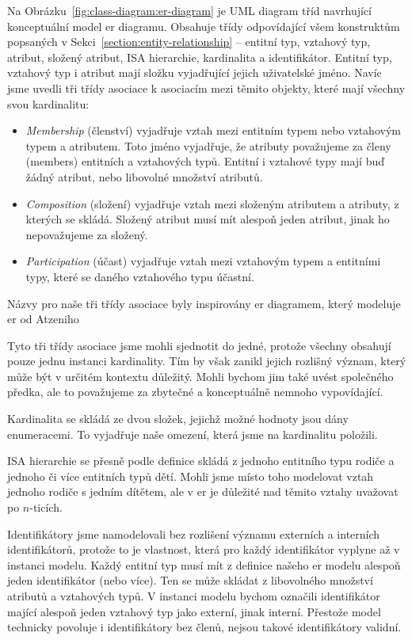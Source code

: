 Na Obrázku~\ref{fig:class-diagram:er-diagram} je \acrshort{UML} diagram tříd navrhující konceptuální model \acrshort{er} diagramu.
Obsahuje třídy odpovídající všem konstruktům popsaných v Sekci~\ref{section:entity-relationship} -- entitní typ, vztahový typ, atribut, složený atribut, ISA hierarchie, kardinalita a identifikátor.
Entitní typ, vztahový typ i atribut mají složku vyjadřující jejich uživatelské jméno.
Navíc jsme uvedli tři třídy asociace k asociacím mezi těmito objekty, které mají všechny svou kardinalitu:
\begin{itemize}
  \item \emph{Membership} (členství) vyjadřuje vztah mezi entitním typem nebo vztahovým typem a atributem.
        Toto jméno vyjadřuje, že atributy považujeme za členy (members) entitních a vztahových typů.
        Entitní i vztahové typy mají buď žádný atribut, nebo libovolné množství atributů.
  \item \emph{Composition} (složení) vyjadřuje vztah mezi složeným atributem a atributy, z kterých se skládá.
        Složený atribut musí mít alespoň jeden atribut, jinak ho nepovažujeme za složený.
  \item \emph{Participation} (účast) vyjadřuje vztah mezi vztahovým typem a entitními typy, které se daného vztahového typu účastní.
\end{itemize}

Názvy pro naše tři třídy asociace byly inspirovány \acrshort{er} diagramem, který modeluje \acrshort{er} od Atzeniho~\cite[Obr.~5.22]{atzeni_database_1999}

Tyto tři třídy asociace jsme mohli sjednotit do jedné, protože všechny obsahují pouze jednu instanci kardinality.
Tím by však zanikl jejich rozlišný význam, který může být v určitém kontextu důležitý.
Mohli bychom jim také uvést společného předka, ale to považujeme za zbytečné a konceptuálně nemnoho vypovídající.

Kardinalita se skládá ze dvou složek, jejichž možné hodnoty jsou dány enumeracemi.
To vyjadřuje naše omezení, která jsme na kardinalitu položili.

ISA hierarchie se přesně podle definice skládá z jednoho entitního typu rodiče a jednoho či více entitních typů dětí.
Mohli jsme místo toho modelovat vztah jednoho rodiče s jedním dítětem, ale v \acrshort{er} je důležité nad těmito vztahy uvažovat po $n$-ticích.

Identifikátory jsme namodelovali bez rozlišení významu externích a interních identifikátorů, protože to je vlastnost, která pro každý identifikátor vyplyne až v instanci modelu.
Každý entitní typ musí mít z definice našeho \acrshort{er} modelu alespoň jeden identifikátor (nebo více).
Ten se může skládat z libovolného množství atributů a vztahových typů.
V instanci modelu bychom označili identifikátor mající alespoň jeden vztahový typ jako externí, jinak interní.
Přestože model technicky povoluje i identifikátory bez členů, nejsou takové identifikátory validní.

